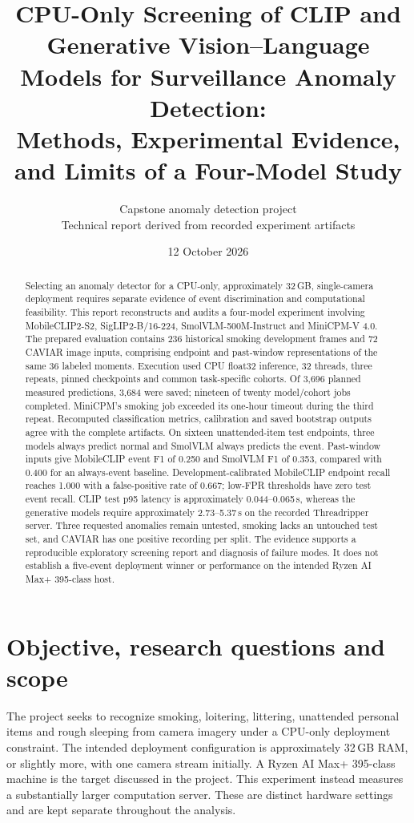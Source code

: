 \documentclass[11pt,a4paper]{article}
\title{CPU-Only Screening of CLIP and Generative Vision--Language Models for Surveillance Anomaly Detection:\\Methods, Experimental Evidence, and Limits of a Four-Model Study}
\author{Capstone anomaly detection project\\Technical report derived from recorded experiment artifacts}
\date{12 October 2026}
\begin{document}
\maketitle
\begin{abstract}
Selecting an anomaly detector for a CPU-only, approximately 32\,GB, single-camera deployment requires separate evidence of event discrimination and computational feasibility. This report reconstructs and audits a four-model experiment involving MobileCLIP2-S2, SigLIP2-B/16-224, SmolVLM-500M-Instruct and MiniCPM-V 4.0. The prepared evaluation contains 236 historical smoking development frames and 72 CAVIAR image inputs, comprising endpoint and past-window representations of the same 36 labeled moments. Execution used CPU float32 inference, 32 threads, three repeats, pinned checkpoints and common task-specific cohorts. Of 3,696 planned measured predictions, 3,684 were saved; nineteen of twenty model/cohort jobs completed. MiniCPM's smoking job exceeded its one-hour timeout during the third repeat. Recomputed classification metrics, calibration and saved bootstrap outputs agree with the complete artifacts. On sixteen unattended-item test endpoints, three models always predict normal and SmolVLM always predicts the event. Past-window inputs give MobileCLIP event F1 of 0.250 and SmolVLM F1 of 0.353, compared with 0.400 for an always-event baseline. Development-calibrated MobileCLIP endpoint recall reaches 1.000 with a false-positive rate of 0.667; low-FPR thresholds have zero test event recall. CLIP test p95 latency is approximately 0.044--0.065\,s, whereas the generative models require approximately 2.73--5.37\,s on the recorded Threadripper server. Three requested anomalies remain untested, smoking lacks an untouched test set, and CAVIAR has one positive recording per split. The evidence supports a reproducible exploratory screening report and diagnosis of failure modes. It does not establish a five-event deployment winner or performance on the intended Ryzen AI Max+ 395-class host.
\end{abstract}

\newpage
\begingroup\small\tableofcontents\endgroup
\newpage

\section{Objective, research questions and scope}
The project seeks to recognize smoking, loitering, littering, unattended personal items and rough sleeping from camera imagery under a CPU-only deployment constraint. The intended deployment configuration is approximately 32\,GB RAM, or slightly more, with one camera stream initially. A Ryzen AI Max+ 395-class machine is the target discussed in the project. This experiment instead measures a substantially larger computation server. These are distinct hardware settings and are kept separate throughout the analysis.
\end{document}

